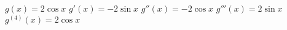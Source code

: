{$g(x) = 2\cos x$
}
{$g'(x) = -2\sin x$ $g''(x) = -2\cos x$ $g'''(x) = 2\sin x$ $g^{(4)}(x) = 2\cos x$
}

